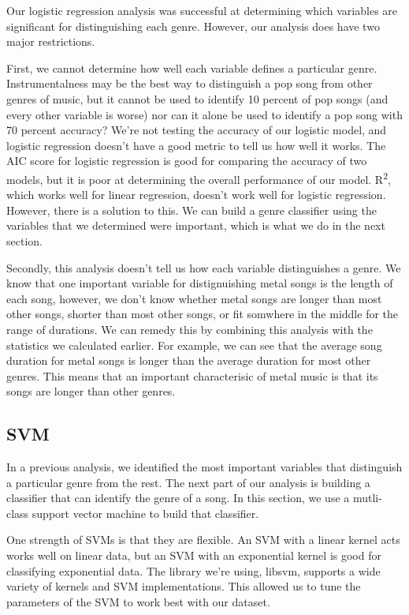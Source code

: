 \documentclass[11pt, a4paper, twocolumn]{article}
\begin{document}
Our logistic regression analysis was successful at determining which variables are significant for distinguishing each genre. However, our analysis does have two major restrictions.

First, we cannot determine how well each variable defines a particular genre. Instrumentalness may be the best way to distinguish a pop song from other genres of music, but it cannot be used to identify 10 percent of pop songs (and every other variable is worse) nor can it alone be used to identify a pop song with 70 percent accuracy? We're not testing the accuracy of our logistic model, and logistic regression doesn't have a good metric to tell us how well it works. The AIC score for logistic regression is good for comparing the accuracy of two models, but it is poor at determining the overall performance of our model. R\textsuperscript{2}, which works well for linear regression, doesn't work well for logistic regression. However, there is a solution to this. We can build a genre classifier using the variables that we determined were important, which is what we do in the next section.

Secondly, this analysis doesn't tell us how each variable distinguishes a genre. We know that one important variable for distignuishing metal songs is the length of each song, however, we don't know whether metal songs are longer than most other songs, shorter than most other songs, or fit somwhere in the middle for the range of durations. We can remedy this by combining this analysis with the statistics we calculated earlier. For example, we can see that the average song duration for metal songs is longer than the average duration for most other genres. This means that an important characterisic of metal music is that its songs are longer than other genres.
\subsection{SVM}
In a previous analysis, we identified the most important variables that distinguish a particular genre from the rest. The next part of our analysis is building a classifier that can identify the genre of a song. In this section, we use a mutli-class support vector machine to build that classifier.

One strength of SVMs is that they are flexible. An SVM with a linear kernel acts works well on linear data, but an SVM with an exponential kernel is good for classifying exponential data. The library we're using, libsvm, supports a wide variety of kernels and SVM implementations. This allowed us to tune the parameters of the SVM to work best with our dataset.
\end{document}
